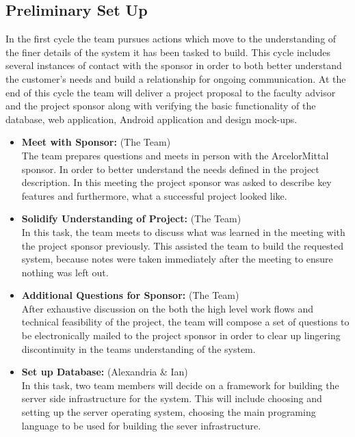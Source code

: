 \documentclass[Letter,11pt]{article}
\begin{document}
		
	\subsection{Preliminary Set Up}\label{cyc1}
		In the first cycle the team pursues actions which move to the understanding of the finer details of the system it has been tasked to build. This cycle includes several instances of contact with the sponsor in order to both better understand the customer's needs and build a relationship for ongoing communication. At the end of this cycle the team will deliver a project proposal to the faculty advisor and the project sponsor along with verifying the basic functionality of the database, web application, Android application and design mock-ups. 
		
		\begin{itemize}
			\item\textbf{Meet with Sponsor:} (The Team)\\
			The team prepares questions and meets in person with the ArcelorMittal sponsor. In order to better understand the needs defined in the project description. In this meeting the project sponsor was asked to describe key features and furthermore, what a successful project looked like.
			
			\item \textbf{Solidify Understanding of Project:} (The Team)\\
			In this task, the team meets to discuss what was learned in the meeting with the project sponsor previously. This assisted the team to build the requested system, because notes were taken immediately after the meeting to ensure nothing was left out. 
			
			\item\textbf{Additional Questions for Sponsor:} (The Team)\\
			After exhaustive discussion on the both the high level work flows and technical feasibility of the project, the team will compose a set of questions to be electronically mailed to the project sponsor in order to clear up lingering discontinuity in the teams understanding of the system.
			
			\item\textbf{Set up Database:} (Alexandria \& Ian)\\
			In this task,  two team members will decide on a framework for building the server side infrastructure for the system. This will include choosing and setting up the server operating system, choosing the main programing language to be used for building the sever infrastructure.
			

\end{itemize}
\end{document}
